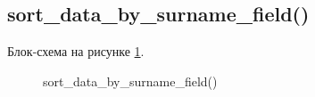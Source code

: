 \subsection{sort\_data\_by\_surname\_field()}

Блок-схема на рисунке \ref{fig:sort_data_by_surname_field}.

\begin{figure}[p]
    \caption{sort\_data\_by\_surname\_field()}
    \label{fig:sort_data_by_surname_field}
\end{figure}





\newpage